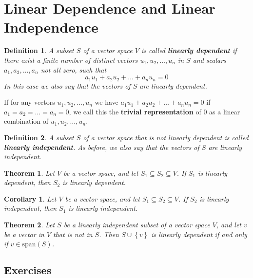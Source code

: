 \documentclass{article}
\newtheorem{theorem}{Theorem}
\newtheorem*{definition}{Definition}
\newtheorem*{corollary}{Corollary}
\begin{document}
\section{Linear Dependence and Linear Independence}
\begin{definition}
	A subset $S$ of a vector space $V$ is called \textbf{linearly dependent} if there exist a finite number of distinct vectors $u_1, u_2, \dots, u_n$ in $S$ and scalars $a_1, a_2, \dots, a_n$ not all zero, such that \[a_1u_1 + a_2u_2 + \dots + a_nu_n = 0\]In this case we also say that the vectors of $S$ are linearly dependent.
\end{definition}

If for any vectors $u_1, u_2, \dots, u_n$ we have $a_1u_1 + a_2u_2 + \dots + a_nu_n = 0$ if $a_1 = a_2 = \dots = a_n = 0$, we call this the \textbf{trivial representation} of $0$ as a linear combination of $u_1, u_2, \dots, u_n$.

\begin{definition}
	A subset $S$ of a vector space that is not linearly dependent is called \textbf{linearly independent}. As before, we also say that the vectors of $S$ are linearly independent.
\end{definition}

\begin{theorem}
	Let $V$ be a vector space, and let $S_1 \subseteq S_2 \subseteq V$. If $S_1$ is linearly dependent, then $S_2$ is linearly dependent.
\end{theorem}
\begin{corollary}
	Let $V$ be a vector space, and let $S_1 \subseteq S_2 \subseteq V$. If $S_2$ is linearly independent, then $S_1$ is linearly independent.
\end{corollary}

\begin{theorem}
	Let $S$ be a linearly independent subset of a vector space $V$, and let $v$ be a vector in $V$ that is not in $S$. Then $S \cup \left\{v\right\}$ is linearly dependent if and only if $v \in \text{span}(S)$.
\end{theorem}

\subsection*{Exercises}
\end{document}
